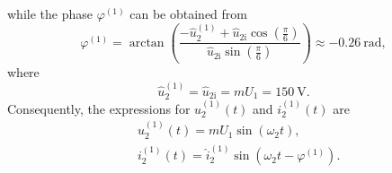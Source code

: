 \begin{solutionblock}
\begin{equation}
        \label{7.1.2:eq:mag_i_2_fund}         
    \end{equation}
    while the phase $\varphi^\mathrm{(1)}$ can be obtained from
    \begin{equation}
        \varphi^\mathrm{(1)} = \arctan(\frac{-\hat{u}^\mathrm{(1)}_\mathrm{2} + \hat{u}_{2\mathrm{i}} \cos(\frac{\pi}{6})}{\hat{u}_{2\mathrm{i}} \sin(\frac{\pi}{6})}) \approx \SI{-0.26}{\radian},
        \label{7.1.2:eq:phase_i_2_fund}         
    \end{equation}
    where 
    \begin{equation}
        \hat{u}^\mathrm{(1)}_\mathrm{2} =  \hat{u}_{2\mathrm{i}} = m U_1 = \SI{150}{\volt}. 
        \label{7.1.2:eq:u_2_fund_ui}          
    \end{equation}
    Consequently, the expressions for $u^\mathrm{(1)}_\mathrm{2}(t)$ and $i^\mathrm{(1)}_\mathrm{2}(t)$ are
    \begin{equation}
        \begin{aligned}
            &u^\mathrm{(1)}_\mathrm{2}(t) = m U_{\mathrm{1}} \sin(\omega_2 t),\\
            &i^\mathrm{(1)}_\mathrm{2}(t) = \hat{i}^\mathrm{(1)}_\mathrm{2} \sin(\omega_2 t - \varphi^\mathrm{(1)}).
        \end{aligned}
        \label{7.1.2:eq:i_u_2_fund}          
    \end{equation}
\end{solutionblock}

